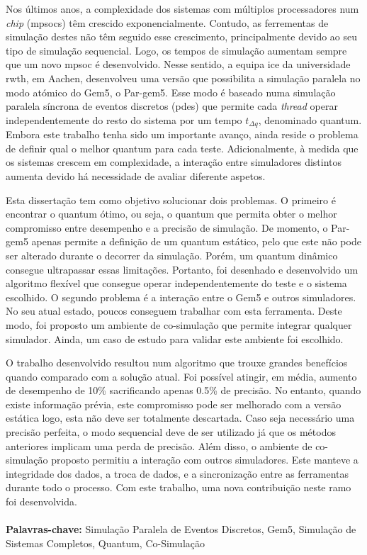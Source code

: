 
\vspace*{-0.5cm}

Nos últimos anos, a complexidade dos sistemas com múltiplos processadores num \textit{chip} (\glspl{mpsoc}) têm crescido exponencialmente. 
Contudo, as ferrementas de simulação destes não têm seguido esse crescimento, principalmente devido ao seu tipo de simulação sequencial. 
Logo, os tempos de simulação aumentam sempre que um novo \gls{mpsoc} é desenvolvido. Nesse sentido, a equipa \gls{ice} da universidade 
\gls{rwth}, em Aachen, desenvolveu uma versão que possibilita a simulação paralela no modo atómico do Gem5, o Par-gem5. Esse modo é baseado 
numa simulação paralela síncrona de eventos discretos (\gls{pdes}) que permite cada \textit{thread} operar independentemente do 
resto do sistema por um tempo $t_{\Delta q}$, denominado quantum. Embora este trabalho tenha sido um importante avanço, ainda reside o problema 
de definir qual o melhor quantum para cada teste. Adicionalmente, à medida que os sistemas crescem em complexidade, a interação entre 
simuladores distintos aumenta devido há necessidade de avaliar diferente aspetos. 

Esta dissertação tem como objetivo solucionar dois problemas. O primeiro é encontrar o quantum ótimo, ou seja, o quantum que permita obter o 
melhor compromisso entre desempenho e a precisão de simulação. De momento, o Par-gem5 apenas permite a definição de um quantum 
estático, pelo que este não pode ser alterado durante o decorrer da simulação. Porém, um quantum dinâmico consegue ultrapassar essas limitações. 
Portanto, foi desenhado e desenvolvido um algoritmo flexível que consegue operar independentemente do teste e o sistema escolhido. O segundo 
problema é a interação entre o Gem5 e outros simuladores. No seu atual estado, poucos conseguem trabalhar com esta ferramenta. Deste modo, foi 
proposto um ambiente de co-simulação que permite integrar qualquer simulador. Ainda, um caso de estudo para validar este ambiente foi escolhido. 

O trabalho desenvolvido resultou num algoritmo que trouxe grandes benefícios quando comparado com a solução atual. Foi possível atingir, 
em média, aumento de desempenho de 10\% sacrificando apenas 0.5\% de precisão. No entanto, quando existe informação prévia, 
este compromisso pode ser melhorado com a versão estática logo, esta não deve ser totalmente descartada. Caso seja necessário uma 
precisão perfeita, o modo sequencial deve de ser utilizado já que os métodos anteriores implicam uma perda de precisão. Além disso, o ambiente 
de co-simulação proposto permitiu a interação com outros simuladores. Este manteve a integridade dos dados, a troca de dados, e a sincronização 
entre as ferramentas durante todo o processo. Com este trabalho, uma nova contribuição neste ramo foi desenvolvida.

\paragraph{}\textbf{Palavras-chave:} Simulação Paralela de Eventos Discretos, Gem5, Simulação de Sistemas Completos, Quantum, Co-Simulação
